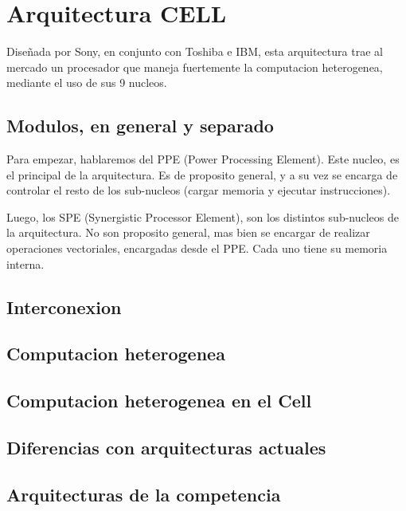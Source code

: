 \documentclass[11pt,compsoc]{IEEEtran}
\begin{document}
	
	\section{Arquitectura CELL}	%
	\noindent Diseñada por Sony, en conjunto con Toshiba e IBM, esta arquitectura trae al mercado un procesador que maneja fuertemente la computacion heterogenea, mediante el uso de sus 9 nucleos.  
	
	\subsection{Modulos, en general y separado} 
	\noindent Para empezar, hablaremos del PPE (Power Processing Element). Este nucleo, es el principal de la arquitectura. Es de proposito general, y a su vez se encarga de controlar el resto de los sub-nucleos (cargar memoria y ejecutar instrucciones).\newline
	
	Luego, los SPE (Synergistic Processor Element), son los distintos sub-nucleos de la arquitectura. No son proposito general, mas bien se encargar de realizar operaciones vectoriales, encargadas desde el PPE. Cada uno tiene su memoria interna.
	
	
	\subsection{Interconexion} 
	\noindent 
	
	\subsection{Computacion heterogenea }
	\noindent 
	
	\subsection{Computacion heterogenea en el Cell }%
	\noindent 
	
	\subsection{Diferencias con arquitecturas actuales}%
	\noindent 
	
	\subsection{Arquitecturas de la competencia}%
	
\end{document}
